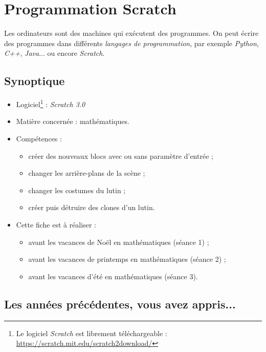 \chapter{Programmation Scratch}  

Les ordinateurs sont des machines qui exécutent des programmes. On peut écrire des programmes dans différents \emph{langages de programmation}, par exemple \emph{Python}, \emph{C++}, \emph{Java}... ou encore \emph{Scratch}.

\section*{Synoptique}

\begin{itemize}
\item Logiciel\footnote{Le logiciel \emph{Scratch} est librement téléchargeable : \url{https://scratch.mit.edu/scratch2download/}} : \emph{Scratch 3.0}
\item Matière concernée : mathématiques.
\item Compétences : 
        \begin{itemize}
        \item créer des nouveaux blocs avec ou sans paramètre d'entrée ;
        \item changer les arrière-plans de la scène ;
        \item changer les costumes du lutin ;
        \item créer puis détruire des clones d'un lutin. 
        \end{itemize}
\item Cette fiche est à réaliser :
        \begin{itemize}
        \item avant les vacances de Noël en mathématiques (séance 1) ;
        \item avant les vacances de printemps en mathématiques (séance 2) ;
        \item avant les vacances d'été en mathématiques (séance 3). 
        \end{itemize}
\end{itemize}





\section*{Les années précédentes, vous avez appris...}

